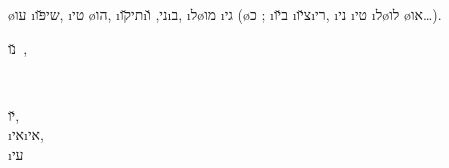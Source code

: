  \o{עו} \i{שי}\u{פּו}, \i{טי} \o{הו}, \i{תי}\u{קו}\i{ני}, \u{ו}\i{ב},  \i{ל}\o{מו}     \i{גי} (\o{כ} ; \i{ב}\u{יו}   \i{צ}\u{יו}\i{רי}, \i{ני} \i{טי}{\gnuvah} \i{ל}\o{לו} \o{או}…).


 \u{נו}~,

~\hfill\begin{minipage}[t]{0.95\linewidth}
	\u{יו},\\
	  \i{אי}\i{אי},\\
	  \i{עי}
\end{minipage}
